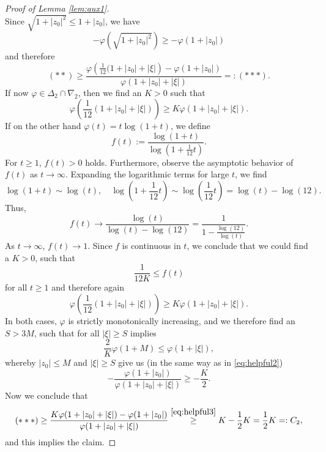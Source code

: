 \documentclass[a4paper,11pt]{amsart}
\numberwithin{equation}{section}
\begin{document}
\begin{proof}[Proof of Lemma \ref{lem:aux1}]
\[		\]
		Since $\sqrt{1+|z_0|^2} \leq 1+|z_0|$, we have \[
		-\varphi \left(\sqrt{1+|z_0|^2} \right)  \geq -\varphi(1+|z_0|)
		\]
		and therefore \[
		(**) \geq \frac{\varphi \left(\frac{1}{12}(1+|z_0|+|\xi| \right) - \varphi(1+|z_0|)}{\varphi(1+|z_0|+|\xi|)} =: (***).
		\]
		If now $\varphi \in \Delta_2 \cap \nabla_2$, then we find an $K>0$ such that \[
		\varphi \left(\frac{1}{12}(1+|z_0|+|\xi|)\right) \geq K\varphi(1+|z_0|+|\xi|).
		\] 
		If on the other hand $\varphi(t) = t \log(1+t)$, we define \[
		f(t) := \frac{\log(1+t)}{\log(1+\frac{1}{12}t)}. 
		\]
		For $t \geq 1$, $f(t) > 0$ holds. Furthermore, observe the asymptotic behavior of $f(t)$ as $t \to \infty$. Expanding the logarithmic terms for large $t$, we find
		\[
		\log(1+t) \sim \log(t), \quad \log\left(1 + \frac{1}{12}t\right) \sim \log\left(\frac{1}{12}t\right) = \log(t) - \log(12).
		\]
		Thus, 
		\[
		f(t) \to \frac{\log(t)}{\log(t) - \log(12)} = \frac{1}{1 - \frac{\log(12)}{\log(t)}}.
		\]
		As $t \to \infty$, $f(t) \to 1$. Since $f$ is continuous in $t$, we conclude that we could find a $K>0$, such that \[
		\frac{1}{12K} \leq f(t)
		\]
		for all $t \geq 1$ and therefore again \[
		\varphi \left(\frac{1}{12}(1+|z_0|+|\xi|) \right) \geq K\varphi(1+|z_0|+|\xi|).
		\]
		In both cases, $\varphi$ is strictly monotonically increasing, and we therefore find an $S>3M$, such that for all $|\xi| \geq S$ implies \[
		\frac{2}{K} \varphi(1+M) \leq \varphi(1+|\xi|),
		\]
		whereby $|z_0| \leq M$ and $|\xi| \geq S$ give us (in the same way as in \eqref{eq:helpful2}) \begin{equation} \label{eq:helpful3}
			-\frac{\varphi(1+|z_{0}|)}{\varphi(1+|z_{0}|+|\xi|)}\geq -\frac{K}{2}. 
		\end{equation}
		Now we conclude that \[
		(***) \geq \frac{K\varphi(1+|z_0|+|\xi|) - \varphi(1+|z_0|)}{\varphi(1+|z_0|+|\xi|)} \overset{\eqref{eq:helpful3}}{\geq} K - \frac{1}{2}K = \frac{1}{2} K =: C_2, 
		\]
		and this implies the claim. 
	\end{proof}
	
\end{document}
